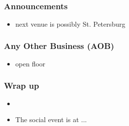 \documentclass{beamer}
\begin{document}
\begin{frame}
    \frametitle{Announcements}
    \begin{itemize}
        \item next venue is possibly St. Petersburg
    \end{itemize}
\end{frame}

\begin{frame}
    \frametitle{Any Other Business (AOB)}
    \begin{itemize}

        \item open floor
    \end{itemize}
\end{frame}

\begin{frame}
    \frametitle{Wrap up}
    \begin{itemize}
        \item 
        \item The social event is at ... 
    \end{itemize}
\end{frame}
\end{document}
